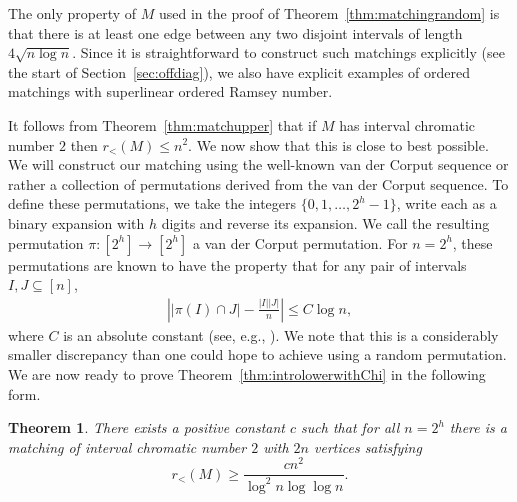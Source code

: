 \documentclass[11pt]{article}
\newtheorem{theorem}{Theorem}[section]
\begin{document}
The only property of $M$ used in the proof of Theorem~\ref{thm:matchingrandom} is that there is at least one edge between any two disjoint intervals of length $4\sqrt{n\log n}$. Since it is straightforward to construct such matchings explicitly (see the start of Section~\ref{sec:offdiag}), we also have explicit examples of ordered matchings with superlinear ordered Ramsey number.

It follows from Theorem~\ref{thm:matchupper} that if $M$ has interval chromatic number $2$ then $r_<(M) \leq n^2$. We now show that this is close to best possible. We will construct our matching using the well-known van der Corput sequence or rather a collection of permutations derived from the van der Corput sequence. To define these permutations, we take the integers $\{0, 1, \dots, 2^h - 1\}$, write each as a binary expansion with $h$ digits and reverse its expansion. We call the resulting permutation $\pi: [2^h] \rightarrow [2^h]$ a van der Corput permutation. For $n = 2^h$, these permutations are known to have the property that for any pair of intervals $I, J \subseteq [n]$,
\begin{align} \label{eq:vandercorput}
\left| |\pi(I) \cap J|- \frac{|I||J|}{n} \right| \leq C\log n,
\end{align} 
where $C$ is an absolute constant (see, e.g., \cite[Chapter 2]{MGD}). We note that this is a considerably smaller discrepancy than one could hope to achieve using a random permutation. We are now ready to prove Theorem~\ref{thm:introlowerwithChi} in the following form.

\begin{theorem} 
There exists a positive constant $c$ such that for all $n = 2^h$ there is a matching of interval chromatic number $2$ with $2n$ vertices satisfying
\[r_<(M) \geq \frac{c n^2}{\log^2 n \log \log n}.\]
\end{theorem}
 
\end{document}
